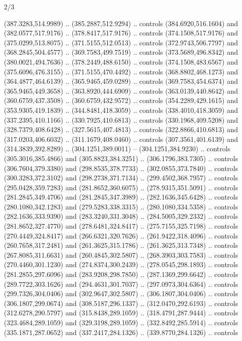 \begin{flagdescription}{2/3}
\begin{scope}[shift={(0.5\flaglength,0.5\flagwidth)},scale=\flagwidth/481.3]
\begin{scope}[y=-0.8pt, x=0.8pt,shift={(-424,-300)}]
  (387.3283,514.9989) .. (385.2887,512.9294) .. controls (384.6920,516.1604) and
  (382.0577,517.9176) .. (378.8417,517.9176) .. controls (374.1508,517.9176) and
  (375.0299,513.8075) .. (371.5155,512.0513) .. controls (372.9743,506.7797) and
  (368.2845,504.4577) .. (369.7583,499.7519) .. controls (373.5689,496.8342) and
  (380.0021,494.7636) .. (378.2449,488.6150) .. controls (374.1508,483.6567) and
  (375.6096,476.3155) .. (371.5155,470.4492) .. controls (368.8802,468.1273) and
  (364.4877,464.6139) .. (365.9465,459.0289) .. controls (369.7583,454.6374) and
  (365.9465,449.3658) .. (363.8920,444.6909) .. controls (363.0139,440.8642) and
  (360.6759,437.3508) .. (360.6759,432.9572) .. controls (354.2289,429.1615) and
  (353.9305,419.1839) .. (344.8481,418.3059) .. controls (338.4010,418.3059) and
  (337.2395,410.1166) .. (330.7925,410.6813) .. controls (330.1968,409.5208) and
  (328.7379,408.6428) .. (327.5615,407.4813) .. controls (322.8866,410.6813) and
  (317.0203,406.6032) .. (311.1679,408.0460) .. controls (307.3561,401.6139) and
  (314.3839,392.8289) .. (304.1251,389.0011) -- (304.1251,384.9230) .. controls
  (305.3016,385.4866) and (305.8823,384.3251) .. (306.1796,383.7305) .. controls
  (306.7604,379.3380) and (298.8535,378.7733) .. (302.0855,373.7840) .. controls
  (300.3283,372.3102) and (298.2738,371.7134) .. (299.4502,368.7957) .. controls
  (295.0428,359.7283) and (281.8652,360.6075) .. (278.9315,351.5091) .. controls
  (281.2845,349.4706) and (281.2845,347.3989) .. (282.1636,345.6428) .. controls
  (280.1080,342.1283) and (279.5283,338.3315) .. (280.1080,334.5358) .. controls
  (282.1636,333.9390) and (283.3240,331.3048) .. (284.5005,329.2332) .. controls
  (281.8652,327.4770) and (278.6481,324.8417) .. (275.7155,325.7198) .. controls
  (270.4449,324.8417) and (266.6321,320.7626) .. (261.9422,318.4096) .. controls
  (260.7658,317.2481) and (261.3625,315.1786) .. (261.3625,313.7348) .. controls
  (267.8085,311.6631) and (260.4845,302.5807) .. (268.3903,303.7583) .. controls
  (270.4460,301.1230) and (274.8374,300.2439) .. (278.0545,298.1893) .. controls
  (281.2855,297.6096) and (283.9208,298.7850) .. (287.1369,299.6642) .. controls
  (289.7722,303.1626) and (294.4631,301.7037) .. (297.0973,304.6364) .. controls
  (299.7326,304.0406) and (302.9647,302.5807) .. (306.1807,304.0406) .. controls
  (306.1807,299.0674) and (308.5187,296.1337) .. (312.0470,292.6193) .. controls
  (312.6278,290.5797) and (315.8438,289.1059) .. (318.4791,287.9444) .. controls
  (323.4684,289.1059) and (329.3198,289.1059) .. (332.8492,285.5914) .. controls
  (335.1871,287.0652) and (337.2417,284.1326) .. (339.8770,284.1326) .. controls

\end{scope}
\end{scope}
\end{flagdescription}
